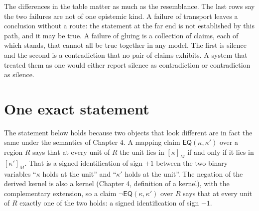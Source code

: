 \documentclass[11pt]{article}
\theoremstyle{plain}
\theoremstyle{definition}
\theoremstyle{remark}
\newcommand{\EQ}{\mathsf{EQ}}
\newcommand{\nk}[1]{\neg#1}
\newcommand{\ext}[2]{[#1]_{#2}}
\begin{document}
The differences in the table matter as much as the resemblance. The last rows say the two failures are not of one epistemic kind. A failure of transport leaves a conclusion without a route: the statement at the far end is not established by this path, and it may be true. A failure of gluing is a collection of claims, each of which stands, that cannot all be true together in any model. The first is silence and the second is a contradiction that no pair of claims exhibits. A system that treated them as one would either report silence as contradiction or contradiction as silence.

\section{One exact statement}\label{sec:exact}

The statement below holds because two objects that look different are in fact the same under the semantics of Chapter 4. A mapping claim $\EQ(\kappa,\kappa')$ over a region $R$ says that at every unit of $R$ the unit lies in $\ext{\kappa}{M}$ if and only if it lies in $\ext{\kappa'}{M}$. That is a signed identification of sign $+1$ between the two binary variables ``$\kappa$ holds at the unit'' and ``$\kappa'$ holds at the unit''. The negation of the derived kernel is also a kernel (Chapter 4, definition of a kernel), with the complementary extension, so a claim $\nk{\EQ(\kappa,\kappa')}$ over $R$ says that at every unit of $R$ exactly one of the two holds: a signed identification of sign $-1$.
\end{document}
